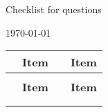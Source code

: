 \documentclass[12pt]{article}
\newcommand{\sep}{1mm}
\newcommand{\negsep}{-3mm}
\begin{document}
\begin{Form}


\begin{center}
\begin{Large}
Checklist for questions
\end{Large}
\vspace{0.15in}



\today

\end{center}

    \begin{longtable}{l L{2.75in} l L{2.75in}}

        & \textbf{Item} && \textbf{Item} \\[\sep]
\hline\\[\negsep]
\endfirsthead

        & \textbf{Item} && \textbf{Item} \\[\sep]
\hline\\[\negsep]
\endhead

\hline\hline
\endfoot



\end{longtable}
\end{Form}
\end{document}
